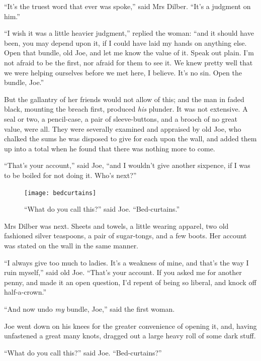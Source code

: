 \documentclass[paper=5.5in:8.5in,BCOR=10mm,twoside,DIV=15,12pt,usegeometry,openany]{scrbook} %
\begin{document}
\enquote{It's the truest word that ever was spoke,} said Mrs Dilber. \enquote{It's a judgment on him.}

\enquote{I wish it was a little heavier judgment,} replied the woman: \enquote{and it should have been, you may depend upon it, if I could have laid my hands on anything else. Open that bundle, old Joe, and let me know the value of it. Speak out plain. I'm not afraid to be the first, nor afraid for them to see it. We knew pretty well that we were helping ourselves before we met here, I believe. It's no sin. Open the bundle, Joe.}

But the gallantry of her friends would not allow of this; and the man in faded black, mounting the breach first, produced \textit{his} plunder. It was not extensive. A seal or two, a pencil-case, a pair of sleeve-buttons, and a brooch of no great value, were all. They were severally examined and appraised by old Joe, who chalked the sums he was disposed to give for each upon the wall, and added them up into a total when he found that there was nothing more to come.

\enquote{That's your account,} said Joe, \enquote{and I wouldn't give another sixpence, if I was to be boiled for not doing it. Who's next?}

\begin{figure}[p]
\begin{minipage}[c]{\linewidth}
\texttt{[image: bedcurtains]}
\caption*{\enquote{What do you call this?} said Joe. \enquote{Bed-curtains.}}
\end{minipage}
\end{figure}

Mrs Dilber was next. Sheets and towels, a little wearing apparel, two old fashioned silver teaspoons, a pair of sugar-tongs, and a few boots. Her account was stated on the wall in the same manner.

\enquote{I always give too much to ladies. It's a weakness of mine, and that's the way I ruin myself,} said old Joe. \enquote{That's your account. If you asked me for another penny, and made it an open question, I'd repent of being so liberal, and knock off half-a-crown.}

\enquote{And now undo \textit{my} bundle, Joe,} said the first woman.

Joe went down on his knees for the greater convenience of opening it, and, having unfastened a great many knots, dragged out a large heavy roll of some dark stuff.

\enquote{What do you call this?} said Joe. \enquote{Bed-curtains?}
\end{document}
